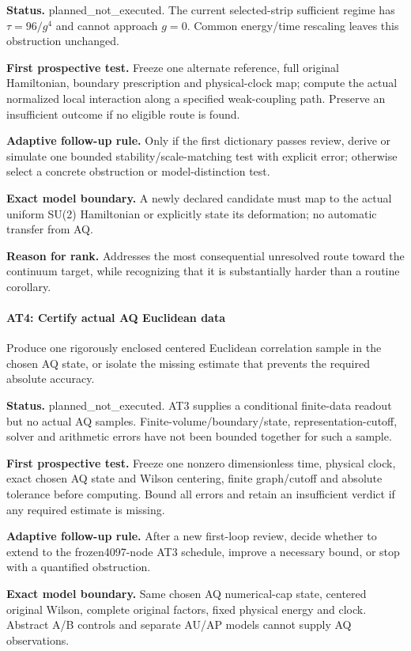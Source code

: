 \textbf{Status.} planned\_not\_executed. The current selected-strip sufficient regime has \(\tau=96/g^{4}\) and cannot approach \(g=0\). Common energy/time rescaling leaves this obstruction unchanged.

\textbf{First prospective test.} Freeze one alternate reference, full original Hamiltonian, boundary prescription and physical-clock map; compute the actual normalized local interaction along a specified weak-coupling path. Preserve an insufficient outcome if no eligible route is found.

\textbf{Adaptive follow-up rule.} Only if the first dictionary passes review, derive or simulate one bounded stability/scale-matching test with explicit error; otherwise select a concrete obstruction or model-distinction test.

\textbf{Exact model boundary.} A newly declared candidate must map to the actual uniform SU(2) Hamiltonian or explicitly state its deformation; no automatic transfer from AQ.

\textbf{Reason for rank.} Addresses the most consequential unresolved route toward the continuum target, while recognizing that it is substantially harder than a routine corollary.

\paragraph{AT4: Certify actual AQ Euclidean data} Produce one rigorously enclosed centered Euclidean correlation sample in the chosen AQ state, or isolate the missing estimate that prevents the required absolute accuracy.

\textbf{Status.} planned\_not\_executed. AT3 supplies a conditional finite-data readout but no actual AQ samples. Finite-volume/boundary/state, representation-cutoff, solver and arithmetic errors have not been bounded together for such a sample.

\textbf{First prospective test.} Freeze one nonzero dimensionless time, physical clock, exact chosen AQ state and Wilson centering, finite graph/cutoff and absolute tolerance before computing. Bound all errors and retain an insufficient verdict if any required estimate is missing.

\textbf{Adaptive follow-up rule.} After a new first-loop review, decide whether to extend to the frozen4097-node AT3 schedule, improve a necessary bound, or stop with a quantified obstruction.

\textbf{Exact model boundary.} Same chosen AQ numerical-cap state, centered original Wilson, complete original factors, fixed physical energy and clock. Abstract A/B controls and separate AU/AP models cannot supply AQ observations.

